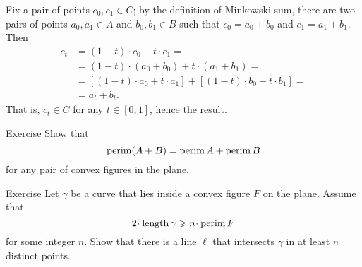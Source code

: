 Fix a pair of points $c_0,c_1\in C$;
by the definition of Minkowski sum, there are two pairs of points $a_0,a_1\in A$ and $b_0,b_1\in B$ such that $c_0=a_0+b_0$ and $c_1=a_1+b_1$.
Then 
\begin{align*}
c_t&=(1-t)\cdot c_0+t\cdot c_1=
\\
&=(1-t)\cdot (a_0+b_0)+t\cdot(a_1+b_1)=
\\
&=[(1-t)\cdot a_0+t\cdot a_1]+[(1-t)\cdot b_0+t\cdot b_1]=
\\
&=a_t+b_t.
\end{align*}
That is, $c_t\in C$ for any $t\in [0,1]$, hence the result.

\begin{thm}{Exercise}
Show that 
\[\mathop{\rm perim}\nolimits(A+B)=\mathop{\rm perim}\nolimits A+\mathop{\rm perim}\nolimits B\]
for any pair of convex figures in the plane.
\end{thm}

\begin{thm}{Exercise}
Let $\gamma$ be a curve that lies inside a convex figure $F$ on the plane.
Assume that
\[2\cdot \length \gamma\ge n\cdot \perim F\]
for some integer $n$.
Show that there is a line $\ell$ that intersects $\gamma$ in at least $n$ distinct points.
\end{thm}

\warning

